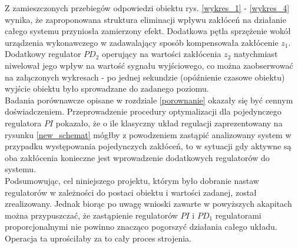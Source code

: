 Z zamieszczonych przebiegów odpowiedzi obiektu rys. \ref{wykres_1} - \ref{wykres_4} wynika, że zaproponowana struktura eliminacji wpływu zakłóceń na działanie całego systemu przyniosła zamierzony efekt. Dodatkowa pętla sprzężenie wokół urządzenia wykonawczego w zadawalający sposób kompensowała zakłócenie $z_1$. Dodatkowy regulator $PD_2$ operujący na wartości zakłócenia $z_2$ natychmiast niwelował jego wpływ na wartość sygnału wyjściowego, co można zaobserwować na załączonych wykresach - po jednej sekundzie (opóźnienie czasowe obiektu) wyjście obiektu było sprowadzane do zadanego poziomu. \\
Badania porównawcze opisane w rozdziale \ref{porownanie} okazały się być cennym doświadczeniem. Przeprowadzenie procedury optymalizacji dla pojedynczego regulatora $PI$ pokazało, że o ile klasyczny układ regulacji zaprezentowany na rysunku \ref{new_schemat} mógłby z powodzeniem zastąpić analizowany system w przypadku występowania pojedynczych zakłóceń, to w sytuacji gdy aktywne są oba zakłócenia konieczne jest wprowadzenie dodatkowych regulatorów do systemu.\\  
Podsumowując, cel niniejszego projektu, którym było dobranie nastaw regulatorów w zależności do postaci obiektu i wartości zadanej, został zrealizowany.  Jednak biorąc po uwagę wnioski zawarte w powyższych akapitach można przypuszczać, że zastąpienie regulatorów $PI$ i $PD_1$ regulatorami proporcjonalnymi nie powinno znacząco pogorszyć działania całego układu. Operacja ta uprościłaby za to cały proces strojenia.  
